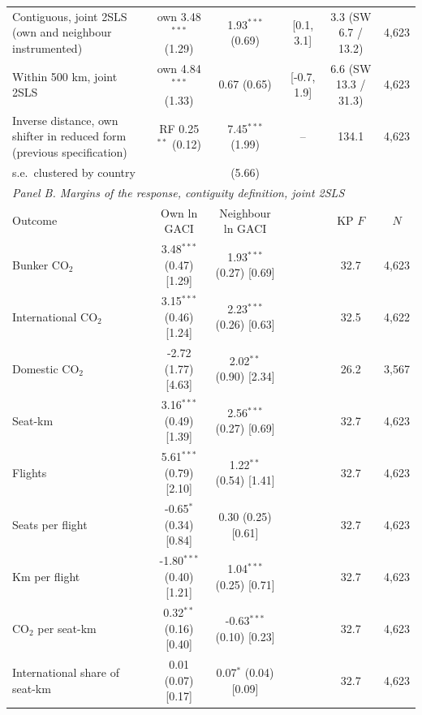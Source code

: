 \begin{table}[htbp]
\begin{threeparttable}
\begin{tabular}{lccccc}
  Contiguous, joint 2SLS (own and neighbour instrumented) & own 3.48$^{***}$ (1.29) & 1.93$^{***}$ (0.69) & [0.1, 3.1] & 3.3 (SW 6.7 / 13.2) & 4,623 \\
  Within 500 km, joint 2SLS & own 4.84$^{***}$ (1.33) & 0.67 (0.65) & [-0.7, 1.9] & 6.6 (SW 13.3 / 31.3) & 4,623 \\
  Inverse distance, own shifter in reduced form (previous specification) & RF 0.25$^{**}$ (0.12) & 7.45$^{***}$ (1.99) & -- & 134.1 & 4,623 \\
  \quad s.e.\ clustered by country & & (5.66) & & & \\
\midrule
\multicolumn{6}{l}{\textit{Panel B. Margins of the response, contiguity definition, joint 2SLS}} \\
Outcome & Own ln GACI & Neighbour ln GACI & & KP $F$ & $N$ \\
\midrule
  Bunker CO$_2$ & 3.48$^{***}$ (0.47) [1.29] & 1.93$^{***}$ (0.27) [0.69] & & 32.7 & 4,623 \\
  International CO$_2$ & 3.15$^{***}$ (0.46) [1.24] & 2.23$^{***}$ (0.26) [0.63] & & 32.5 & 4,622 \\
  Domestic CO$_2$ & -2.72 (1.77) [4.63] & 2.02$^{**}$ (0.90) [2.34] & & 26.2 & 3,567 \\
  Seat-km & 3.16$^{***}$ (0.49) [1.39] & 2.56$^{***}$ (0.27) [0.69] & & 32.7 & 4,623 \\
  Flights & 5.61$^{***}$ (0.79) [2.10] & 1.22$^{**}$ (0.54) [1.41] & & 32.7 & 4,623 \\
  Seats per flight & -0.65$^{*}$ (0.34) [0.84] & 0.30 (0.25) [0.61] & & 32.7 & 4,623 \\
  Km per flight & -1.80$^{***}$ (0.40) [1.21] & 1.04$^{***}$ (0.25) [0.71] & & 32.7 & 4,623 \\
  CO$_2$ per seat-km & 0.32$^{**}$ (0.16) [0.40] & -0.63$^{***}$ (0.10) [0.23] & & 32.7 & 4,623 \\
  International share of seat-km & 0.01 (0.07) [0.17] & 0.07$^{*}$ (0.04) [0.09] & & 32.7 & 4,623 \\
\bottomrule
\end{tabular}
\begin{tablenotes}[flushleft]
\footnotesize

\end{tablenotes}
\end{threeparttable}
\end{table}
